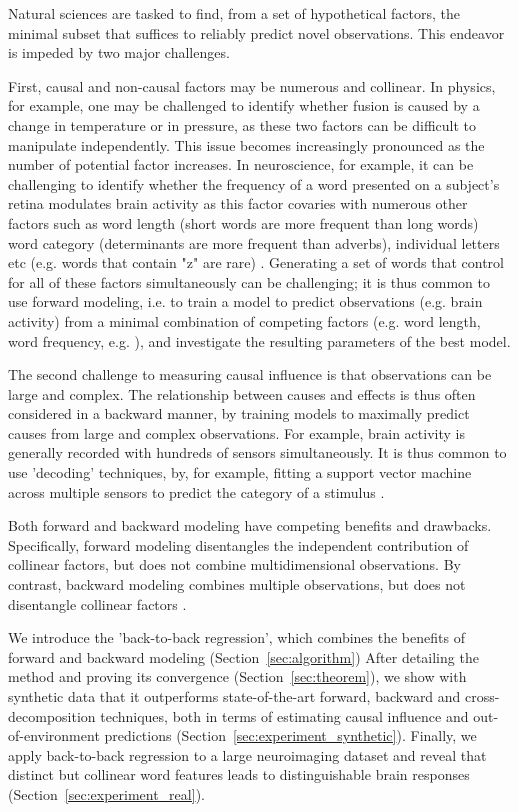 Natural sciences are tasked to find, from a set of hypothetical factors, the minimal subset that suffices to reliably predict novel observations. This endeavor is impeded by two major challenges.

First, causal and non-causal factors may be numerous and collinear. In physics, for example, one may be challenged to identify whether fusion is caused by a change in temperature or in pressure, as these two factors can be difficult to manipulate independently. This issue becomes increasingly pronounced as the number of potential factor increases. In neuroscience, for example, it can be challenging to identify whether the frequency of a word presented on a subject's retina modulates brain activity as this factor covaries with numerous other factors such as word length (short words are more frequent than long words) word category (determinants are more frequent than adverbs), individual letters etc (e.g. words that contain "z" are rare) \citep{kutas2011thirty,pegado2014timing}. Generating a set of words that control for all of these factors simultaneously can be challenging; it is thus common to use forward modeling, i.e. to train a model to predict observations (e.g. brain activity) from a minimal combination of competing factors (e.g. word length, word frequency, e.g. \citep{huth2016natural}), and investigate the resulting parameters of the best model.

The second challenge to measuring causal influence is that observations can be large and complex. The relationship between causes and effects is thus often considered in a backward manner, by training models to maximally predict causes from large and complex observations. For example, brain activity is generally recorded with hundreds of sensors simultaneously. It is thus common to use 'decoding' techniques, by, for example, fitting a support vector machine across multiple sensors to predict the category of a stimulus \citep{cichy2014resolving, king2016brain, kriegeskorte2008representational}.

Both forward and backward modeling have competing benefits and drawbacks. Specifically, forward modeling disentangles the independent contribution of collinear factors, but does not combine multidimensional observations. By contrast, backward modeling combines multiple observations, but does not disentangle collinear factors \cite{weichwald2015causal, hebart2018deconstructing, king2018encoding}.

We introduce the 'back-to-back regression', which combines the benefits of forward and backward modeling (Section~\ref{sec:algorithm}) After detailing the method and proving its convergence (Section~\ref{sec:theorem}), we show with synthetic data that it outperforms state-of-the-art forward, backward and cross-decomposition techniques, both in terms of estimating causal influence and out-of-environment predictions (Section~\ref{sec:experiment_synthetic}). Finally, we apply back-to-back regression to a large neuroimaging dataset and reveal that distinct but collinear word features leads to distinguishable brain responses (Section~\ref{sec:experiment_real}).
